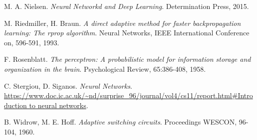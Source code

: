 \documentclass[11pt, a4paper]{report}
\numberwithin{equation}{chapter}
\theoremstyle{theorem}
\theoremstyle{definition}
\numberwithin{figure}{section}
\begin{document}
\begin{thebibliography}{50}
		M. A. Nielsen. \emph{Neural Networkd and Deep Learning}. Determination Press, 2015.
		
		M. Riedmiller, H. Braun. \emph{A direct adaptive method for faster backpropagation learning: The rprop algorithm}. Neural Networks, IEEE International Conference on, 596-591, 1993.
		
		F. Rosenblatt. \emph{The perceptron: A probabilistic model for information storage and organization in the brain}. Psychological Review, 65:386-408, 1958.
		
		C. Stergiou, D. Siganos. \emph{Neural Networks}. \url{https://www.doc.ic.ac.uk/~nd/surprise_96/journal/vol4/cs11/report.html#Introduction to neural networks}.
		
		B. Widrow, M. E. Hoff. \emph{Adaptive switching circuits}. Proceedings WESCON, 96-104, 1960.
		
	\end{thebibliography}	
	
\end{document}
